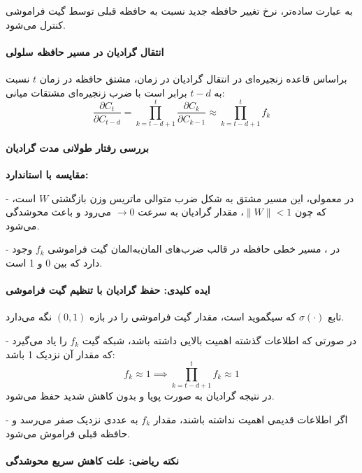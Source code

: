 \documentclass{article}
\begin{document}
به عبارت ساده‌تر، نرخ تغییر حافظه جدید نسبت به حافظه قبلی توسط گیت فراموشی کنترل می‌شود.



\paragraph{انتقال گرادیان در مسیر حافظه سلولی}

براساس قاعده زنجیره‌ای در انتقال گرادیان در زمان، مشتق حافظه در زمان \(t\) نسبت به \(t-d\) برابر است با ضرب زنجیره‌ای مشتقات میانی:
\begin{equation}
	\frac{\partial C_t}{\partial C_{t-d}} = \prod_{k=t-d+1}^t \frac{\partial C_k}{\partial C_{k-1}} \approx \prod_{k=t-d+1}^t f_k
	\label{eq:grad_product}
\end{equation}



\paragraph{بررسی رفتار طولانی مدت گرادیان}



\textbf{مقایسه با  استاندارد:}

- در  معمولی، این مسیر مشتق به شکل ضرب متوالی ماتریس وزن بازگشتی \(W\) است، که چون 
\(\|W\| < 1\)، مقدار گرادیان به سرعت \(\to 0\) می‌رود و باعث محوشدگی می‌شود.

- در ، مسیر خطی حافظه در قالب ضرب‌های المان‌به‌المان گیت فراموشی \(f_k\) وجود دارد که بین 0 و 1 است.



\paragraph{ایده کلیدی: حفظ گرادیان با تنظیم گیت فراموشی}

تابع \(\sigma(\cdot)\) که سیگموید است، مقدار گیت فراموشی را در بازه \((0,1)\) نگه می‌دارد.

- در صورتی که اطلاعات گذشته اهمیت بالایی داشته باشد، شبکه گیت \(f_k\) را یاد می‌گیرد که مقدار آن نزدیک 1 باشد:
\begin{equation}
f_k \approx 1 \implies \prod_{k=t-d+1}^t f_k \approx 1
\end{equation}
در نتیجه گرادیان به صورت پویا و بدون کاهش شدید حفظ می‌شود.

- اگر اطلاعات قدیمی اهمیت نداشته باشند، مقدار \(f_k\) به عددی نزدیک صفر می‌رسد و حافظه قبلی فراموش می‌شود.


\paragraph{نکته ریاضی: علت کاهش سریع محوشدگی}
\end{document}
